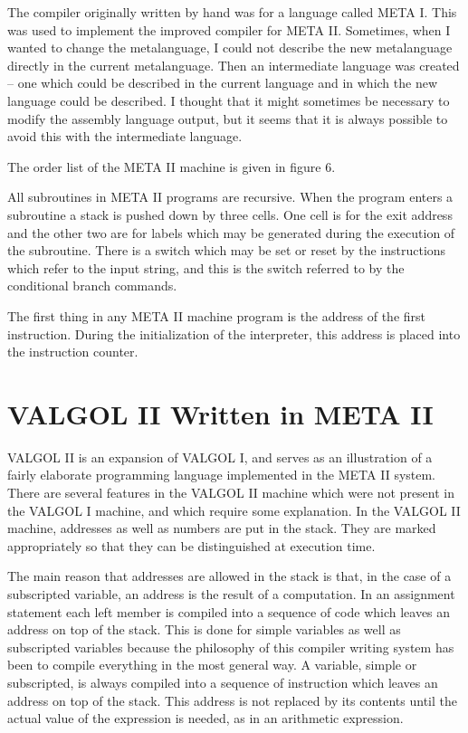 \documentclass[twocolumn]{article}
\begin{document}
The compiler originally written by hand was for a language called META I.
This was used to implement the improved compiler for META II.
Sometimes, when I wanted to change the metalanguage, I could not describe
the new metalanguage directly in the current metalanguage.
Then an intermediate language was created -- one which could be described in
the current language and in which the new language could be described.
I thought that it might sometimes be necessary to modify the assembly language
output, but it seems that it is always possible to avoid this with the
intermediate language.

The order list of the META II machine is given in figure 6.

All subroutines in META II programs are recursive.
When the program enters a subroutine a stack is pushed down by three cells.
One cell is for the exit address and the other two are for labels which may be
generated during the execution of the subroutine.
There is a switch which may be set or reset by the instructions which refer
to the input string, and this is the switch referred to by the conditional
branch commands.

The first thing in any META II machine program is the address of the first
instruction.
During the initialization of the interpreter, this address is placed into
the instruction counter.

\section{VALGOL II Written in META II}

VALGOL II is an expansion of VALGOL I, and serves as an illustration of a
fairly elaborate programming language implemented in the META II system.
There are several features in the VALGOL II machine which were not present in
the VALGOL I machine, and which require some explanation.
In the VALGOL II machine, addresses as well as numbers are put in the stack.
They are marked appropriately so that they can be distinguished at execution
time.

The main reason that addresses are allowed in the stack is that, in the case
of a subscripted variable, an address is the result of a computation.
In an assignment statement each left member is compiled into a sequence of
code which leaves an address on top of the stack.
This is done for simple variables as well as subscripted variables because the
philosophy of this compiler writing system has been to compile everything in
the most general way.
A variable, simple or subscripted, is always compiled into a sequence of
instruction which leaves an address on top of the stack.
This address is not replaced by its contents until the actual value of the
expression is needed, as in an arithmetic expression.
\end{document}
